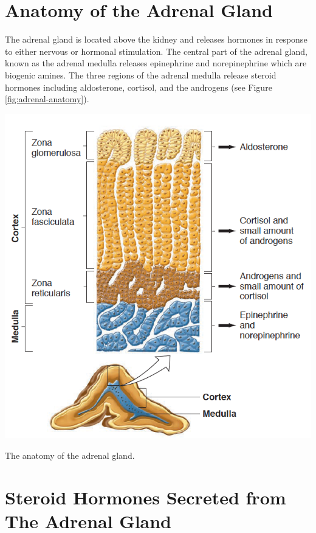 \documentclass{tufte-handout}
\begin{document}
\pagebreak

\section{Anatomy of the Adrenal Gland}

The adrenal gland is located above the kidney and releases hormones in response to either nervous or hormonal stimulation.  The central part of the adrenal gland, known as the adrenal medulla releases epinephrine and norepinephrine which are biogenic amines.  The three regions of the adrenal medulla release steroid hormones including aldosterone, cortisol, and the androgens (see Figure \ref{fig:adrenal-anatomy}).

\begin{marginfigure}
  \includegraphics{figures/adrenal-anatomy}
  \caption{The anatomy of the adrenal gland.}
    \label{fig:adrenal-anatomy}
\end{marginfigure}

\section{Steroid Hormones Secreted from The Adrenal Gland}
\end{document}
